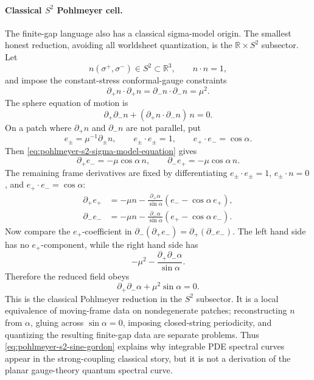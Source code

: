 \paragraph{Classical \(S^2\) Pohlmeyer cell.}
The finite-gap language also has a classical sigma-model origin.  The
smallest honest reduction, avoiding all worldsheet quantization, is the
\(\mathbb R\times S^2\) subsector.  Let
\[
  n(\sigma^+,\sigma^-)\in S^2\subset\mathbb R^3,
  \qquad n\cdot n=1,
\]
and impose the constant-stress conformal-gauge constraints
\[
  \partial_+ n\cdot\partial_+ n
  =
  \partial_- n\cdot\partial_- n
  =
  \mu^2 .
\]
The sphere equation of motion is
\begin{equation}
  \partial_+\partial_- n
  +
  (\partial_+n\cdot\partial_-n)\,n
  =
  0 .
  \label{eq:pohlmeyer-s2-sigma-model-equation}
\end{equation}
On a patch where \(\partial_+n\) and \(\partial_-n\) are not parallel, put
\[
  e_\pm=\mu^{-1}\partial_\pm n,
  \qquad
  e_\pm\cdot e_\pm=1,
  \qquad
  e_+\cdot e_-=\cos\alpha .
\]
Then \eqref{eq:pohlmeyer-s2-sigma-model-equation} gives
\[
  \partial_+e_-=-\mu\cos\alpha\,n,
  \qquad
  \partial_-e_+=-\mu\cos\alpha\,n .
\]
The remaining frame derivatives are fixed by differentiating
\(e_\pm\cdot e_\pm=1\), \(e_\pm\cdot n=0\), and
\(e_+\cdot e_-=\cos\alpha\):
\[
\begin{aligned}
  \partial_+ e_+
  &=
  -\mu n
  -
  \frac{\partial_+\alpha}{\sin\alpha}
  (e_- -\cos\alpha\,e_+),
  \\
  \partial_- e_-
  &=
  -\mu n
  -
  \frac{\partial_-\alpha}{\sin\alpha}
  (e_+ -\cos\alpha\,e_-).
\end{aligned}
\]
Now compare the \(e_+\)-coefficient in
\(\partial_-(\partial_+e_-)=\partial_+(\partial_-e_-)\).  The left hand side
has no \(e_+\)-component, while the right hand side has
\[
  -\mu^2
  -
  \frac{\partial_+\partial_-\alpha}{\sin\alpha}.
\]
Therefore the reduced field obeys
\begin{equation}
  \partial_+\partial_-\alpha+\mu^2\sin\alpha=0 .
  \label{eq:pohlmeyer-s2-sine-gordon}
\end{equation}
This is the classical Pohlmeyer reduction in the \(S^2\) subsector.  It is a
local equivalence of moving-frame data on nondegenerate patches; reconstructing
\(n\) from \(\alpha\), gluing across \(\sin\alpha=0\), imposing closed-string
periodicity, and quantizing the resulting finite-gap data are separate
problems.  Thus \eqref{eq:pohlmeyer-s2-sine-gordon} explains why integrable
PDE spectral curves appear in the strong-coupling classical story, but it is
not a derivation of the planar gauge-theory quantum spectral curve.


